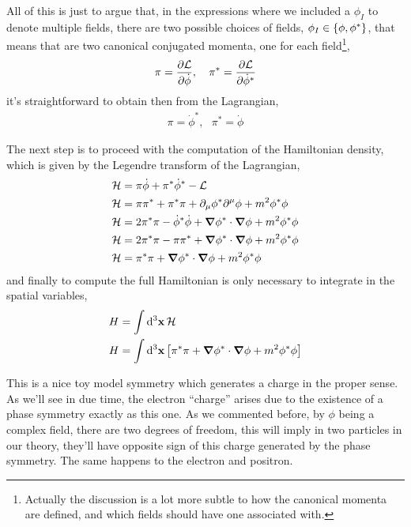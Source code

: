 All of this is just to argue that, in the expressions where we included a 
$\phi_I$ to denote multiple fields, there are two possible choices of fields, 
$\phi_I\in\qty{\phi,\phi^\ast}$, that means that are two canonical conjugated 
momenta, one for each field\footnote{Actually the discussion is a lot more subtle to how the 
canonical momenta are defined, and which fields should have one associated with.},
\begin{align}
    \pi  = \pdv{\mathcal L}{\dot \phi},\ \ \ \pi^\ast  = \pdv{\mathcal L}{\dot \phi^\ast}
\end{align}
it's straightforward to obtain then from the Lagrangian,
\begin{align}
    \pi = \dot\phi^\ast,\ \ \ \pi^\ast = \dot\phi
\end{align}

The next step is to proceed with the computation of the Hamiltonian 
density, which is given by the Legendre transform of the Lagrangian,
\begin{align}
    \mathcal H  &= \pi\dot \phi+\pi^\ast\dot \phi^\ast - \mathcal L\\
    \mathcal H  &= \pi\pi^\ast+\pi^\ast\pi +\partial_\mu\phi^\ast\partial^\mu\phi +m^2\phi^\ast\phi\\
    \mathcal H  &= 2\pi^\ast\pi -\dot\phi^\ast\dot \phi+\grad\phi^\ast\cdot\grad\phi +m^2\phi^\ast\phi\\
    \mathcal H  &= 2\pi^\ast\pi -\pi\pi ^\ast+\grad\phi^\ast\cdot\grad\phi +m^2\phi^\ast\phi\\
    \mathcal H  &= \pi^\ast\pi+\grad\phi^\ast\cdot\grad\phi +m^2\phi^\ast\phi
\end{align}
and finally to compute the full Hamiltonian is only necessary to integrate in the spatial variables,
\begin{align}
    H&=\int\dd[3]{\vb x}\mathcal H\\
    H&=\int\dd[3]{\vb x}\qty[\pi^\ast\pi+\grad\phi^\ast\cdot\grad\phi +m^2\phi^\ast\phi]
\end{align}

\probitem{}

This is a nice toy model symmetry which generates a charge in the proper 
sense. As we'll see in due time, the electron ``charge'' arises due to 
the existence of a phase symmetry exactly as this one. As we commented 
before, by $\phi$ being a complex field, there are two degrees of freedom, 
this will imply in two particles in our theory, they'll have opposite 
sign of this charge generated by the phase symmetry. The same happens to 
the electron and positron.

